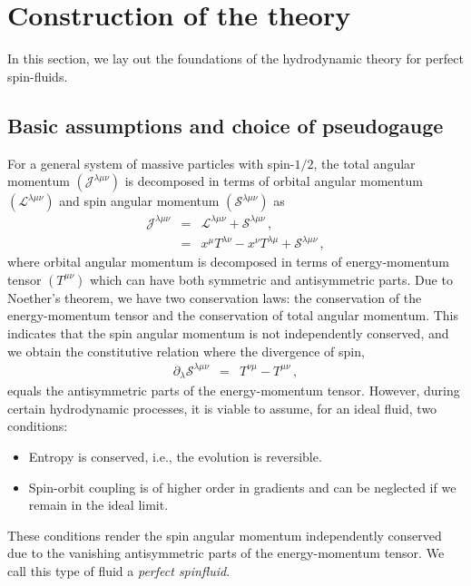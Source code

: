 \documentclass[12pt,aps,prd,nofootinbib,noshowkeys,noshowpacs,longbibliography,
superscriptaddress,tightenlines,floatfix,preprintnumbers]{revtex4-2}
\begin{document}
\section{Construction of the theory}
\label{sec:construction}

In this section, we lay out the foundations of the hydrodynamic theory for perfect spin-fluids.

\subsection{Basic assumptions and choice of pseudogauge}\label{basicassumptions}
%
For a general system of massive particles with spin-$1/2$, the total angular momentum $(\mathcal{J}^{\lambda\mu\nu})$ is decomposed in terms of orbital angular momentum $(\mathcal{L}^{\lambda\mu\nu})$ and spin angular momentum $(\mathcal{S}^{\lambda\mu\nu})$ as
\begin{eqnarray}
    \mathcal{J}^{\lambda\mu\nu} &=& \mathcal{L}^{\lambda\mu\nu} + \mathcal{S}^{\lambda\mu\nu}\,,\nonumber\\
    &=& x^\mu T^{\lambda\nu} - x^\nu T^{\lambda\mu} + \mathcal{S}^{\lambda\mu\nu}\,,
    \label{eq:totalAM}
\end{eqnarray}
where orbital angular momentum is decomposed in terms of energy-momentum tensor $\left(T^{\mu\nu}\right)$ which can have both symmetric and antisymmetric parts. Due to Noether's theorem, we have two conservation laws: the conservation of the energy-momentum tensor and the conservation of total angular momentum. This indicates that the spin angular momentum is not independently conserved, and we obtain the constitutive relation where the divergence of spin,
\begin{eqnarray}
    \partial_\lambda \mathcal{S}^{\lambda\mu\nu} &=& T^{\nu\mu} - T^{\mu\nu}\,,
    \label{eq:divergence_spin}
\end{eqnarray}
equals the antisymmetric parts of the energy-momentum tensor. However, during certain hydrodynamic processes, it is viable to assume, for an ideal fluid, two conditions:
\begin{itemize}
    \item[(i)] Entropy is conserved, i.e., the evolution is reversible.
    \item[(ii)] Spin-orbit coupling is of higher order in gradients and can be neglected if we remain in the ideal limit.
\end{itemize}
These conditions render the spin angular momentum independently conserved due to the vanishing antisymmetric parts of the energy-momentum tensor. We call this type of fluid a \emph{perfect spinfluid}.
\end{document}
